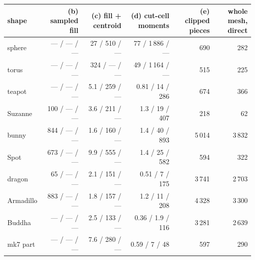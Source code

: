 \begin{tabular}{lrrrrr}
\toprule
shape & (b) sampled fill & (c) fill + centroid & (d) cut-cell moments & (e) clipped pieces & whole mesh, direct \\
\midrule
sphere & --- / --- / --- & 27 / 510 / --- & 77 / 1\,886 / --- & 690 & 282 \\
torus & --- / --- / --- & 324 / --- / --- & 49 / 1\,164 / --- & 515 & 225 \\
teapot & --- / --- / --- & 5.1 / 259 / --- & 0.81 / 14 / 286 & 674 & 366 \\
Suzanne & 100 / --- / --- & 3.6 / 211 / --- & 1.3 / 19 / 407 & 218 & 62 \\
\midrule
bunny & 844 / --- / --- & 1.6 / 160 / --- & 1.4 / 40 / 893 & 5\,014 & 3\,832 \\
Spot & 673 / --- / --- & 9.9 / 555 / --- & 1.4 / 25 / 582 & 594 & 322 \\
dragon & 65 / --- / --- & 2.1 / 151 / --- & 0.51 / 7 / 175 & 3\,741 & 2\,703 \\
Armadillo & 883 / --- / --- & 1.8 / 157 / --- & 1.2 / 11 / 208 & 4\,328 & 3\,300 \\
Buddha & --- / --- / --- & 2.5 / 133 / --- & 0.36 / 1.9 / 116 & 3\,281 & 2\,639 \\
mk7 part & --- / --- / --- & 7.6 / 280 / --- & 0.59 / 7 / 48 & 597 & 290 \\
\bottomrule
\end{tabular}
